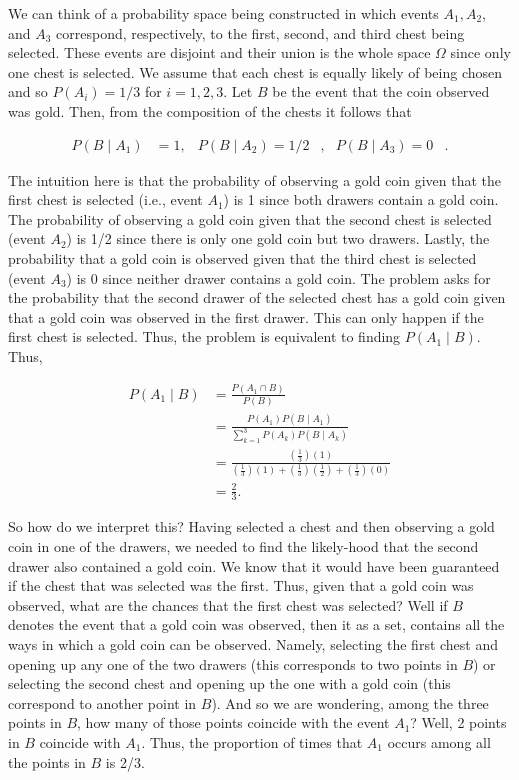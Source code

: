 \documentclass{article}
\makeatletter
\theoremstyle{definition}
\theoremstyle{remark}
\theoremstyle{definition}
\newenvironment{solution}[1][\bf{\textit{Solution}}]{\par
  
  \normalfont \topsep6\p@\@plus6\p@\relax
  \list{}{\leftmargin=0mm
          \rightmargin=0mm
          \settowidth{\itemindent}{\itshape#1}%
          \labelwidth=\itemindent
          \parsep=0pt \listparindent=\parindent 
  }
  \item[\hskip\labelsep
        \itshape
    #1\@addpunct{.}]\ignorespaces
}{%
  \popQED\endlist\@endpefalse
}
\makeatother
\begin{document}
\begin{solution}
    We can think of a probability space being constructed in which events $A_1, A_2$, and $A_3$ correspond, respectively, to the first, second, and third chest being selected. These events are disjoint and their union is the whole space $\Omega$ since only one chest is selected. We assume that each chest is equally likely of being chosen and so $P(A_i)=1/3$ for $i=1,2,3$. Let $B$ be the event that the coin observed was gold. Then, from the composition of the chests it follows that 
    
    \begin{align}
        P(B\mid A_1)&=1, &P(B\mid A_2)=1/2&, &P(B\mid A_3)=0&.
    \end{align}
    
    \noindent The intuition here is that the probability of observing a gold coin given that the first chest is selected (i.e., event $A_1$) is 1 since both drawers contain a gold coin. The probability of observing a gold coin given that the second chest is selected (event $A_2$) is 1/2 since there is only one gold coin but two drawers. Lastly, the probability that a gold coin is observed given that the third chest is selected (event $A_3$) is 0 since neither drawer contains a gold coin. The problem asks for the probability that the second drawer of the selected chest has a gold coin given that a gold coin was observed in the first drawer. This can only happen if the first chest is selected. Thus, the problem is equivalent to finding $P(A_1\mid B)$. Thus, 
    
    \begin{equation*}
        \begin{split}
            P(A_1\mid B)&=\frac{P(A_1\cap B)}{P(B)} \\
            &=\frac{P(A_1)P(B\mid A_1)}{\sum_{k=1}^{3}P(A_k)P(B\mid A_k)} \\
            &= \frac{(\frac{1}{3})(1)}{(\frac{1}{3})(1)+(\frac{1}{3})(\frac{1}{2})+(\frac{1}{3})(0)} \\
            &= \frac{2}{3}.
        \end{split}
    \end{equation*}
    
    So how do we interpret this? Having selected a chest and then observing a gold coin in one of the drawers, we needed to find the likely-hood that the second drawer also contained a gold coin. We know that it would have been guaranteed if the chest that was selected was the first. Thus, given that a gold coin was observed, what are the chances that the first chest was selected? Well if $B$ denotes the event that a gold coin was observed, then it as a set, contains all the ways in which a gold coin can be observed. Namely, selecting the first chest and opening up any one of the two drawers (this corresponds to two points in $B$) or selecting the second chest and opening up the one with a gold coin (this correspond to another point in $B$). And so we are wondering, among the three points in $B$, how many of those points coincide with the event $A_1$? Well, 2 points in $B$ coincide with $A_1$. Thus, the proportion of times that $A_1$ occurs among all the points in $B$ is 2/3.
\end{solution}
\end{document}
